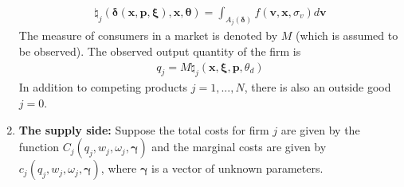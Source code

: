 \documentclass[11pt]{elegantbook}
\begin{document}
\begin{enumerate}
\begin{equation}
        \begin{aligned}
            \natural_j(\boldsymbol{\delta}(\boldsymbol{x},\boldsymbol{p},\boldsymbol{\xi}),\boldsymbol{x},\boldsymbol{\theta})=\int_{A_j(\boldsymbol{\delta})}f(\boldsymbol{v},\boldsymbol{x},\sigma_v)d \boldsymbol{v}
        \end{aligned}
        \nonumber
    \end{equation}
    The measure of consumers in a market is denoted by $M$ (which is assumed to be observed). The observed output quantity of the firm is
    \begin{equation}
        \begin{aligned}
            q_j=M \natural_j(\boldsymbol{x},\boldsymbol{\xi},\boldsymbol{p},\theta_d)
        \end{aligned}
        \nonumber
    \end{equation}
    In addition to competing products $j=1,...,N$, there is also an outside good $j=0$.
    \item \textbf{The supply side:} Suppose the total costs for firm $j$ are given by the function $C_j(q_j,w_j,\omega_j,\boldsymbol{\gamma})$ and the marginal costs are given by $c_j(q_j,w_j,\omega_j,\boldsymbol{\gamma})$, where $\boldsymbol{\gamma}$ is a vector of unknown parameters.
\end{enumerate}
\end{document}
